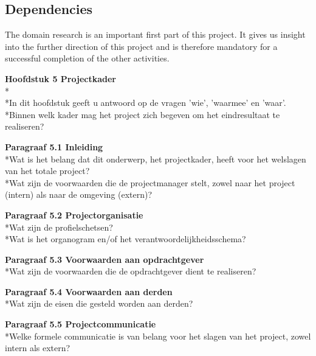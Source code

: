 \documentclass{article}
\begin{document}
\subsection{Dependencies}
The domain research is an important first part of this project. It gives us insight into the further direction of this project and is therefore mandatory for a successful completion of the other activities.
\newline
\newline

\textbf{Hoofdstuk 5 Projectkader}
\\*
\\*In dit hoofdstuk geeft u antwoord op de vragen 'wie', 'waarmee' en 'waar'.
\\*Binnen welk kader mag het project zich begeven om het eindresultaat te realiseren?
\newline

\noindent
\textbf{Paragraaf 5.1 Inleiding}
\\*Wat is het belang dat dit onderwerp, het projectkader, heeft voor het welslagen van het totale project?
\\*Wat zijn de voorwaarden die de projectmanager stelt, zowel naar het project (intern) als naar de omgeving (extern)?
\newline

\noindent
\textbf{Paragraaf 5.2 Projectorganisatie}
\\*Wat zijn de profielschetsen?
\\*Wat is het organogram en/of het verantwoordelijkheidsschema?
\newline

\noindent
\textbf{Paragraaf 5.3 Voorwaarden aan opdrachtgever}
\\*Wat zijn de voorwaarden die de opdrachtgever dient te realiseren?
\newline

\noindent
\textbf{Paragraaf 5.4 Voorwaarden aan derden}
\\*Wat zijn de eisen die gesteld worden aan derden?
\newline

\noindent
\textbf{Paragraaf 5.5 Projectcommunicatie}
\\*Welke formele communicatie is van belang voor het slagen van het project, zowel intern als extern?
\newline
\end{document}
